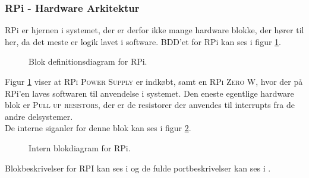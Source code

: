 \documentclass[Rapport/Rapport_main.tex]{subfiles}
\begin{document}
\subsubsection{RPi - Hardware Arkitektur}
RPi er hjernen i systemet, der er derfor ikke mange hardware blokke, der hører til her, da det meste er logik lavet i software. BDD'et for RPi kan ses i figur \ref{fig:rap_rpi_hardware_bdd}.
\begin{figure}[H]
    \centering
    \caption{Blok definitionsdiagram for RPi.}
    \label{fig:rap_rpi_hardware_bdd}
\end{figure}
Figur \ref{fig:rap_rpi_hardware_bdd} viser at \textsc{RPi Power Supply} er indkøbt, samt en \textsc{RPi Zero W}, hvor der på RPi'en laves softwaren til anvendelse i systemet. Den eneste egentlige hardware blok er \textsc{Pull up resistors}, der er de resistorer der anvendes til interrupts fra de andre delsystemer.\\
De interne siganler for denne blok kan ses i figur \ref{fig:rap_rpi_hardware_ibd}.
\begin{figure}[H]
    \centering
    \caption{Intern blokdiagram for RPi.}
    \label{fig:rap_rpi_hardware_ibd}
\end{figure}
Blokbeskrivelser for RPI kan ses i  og de fulde portbeskrivelser kan ses i . 
\end{document}
